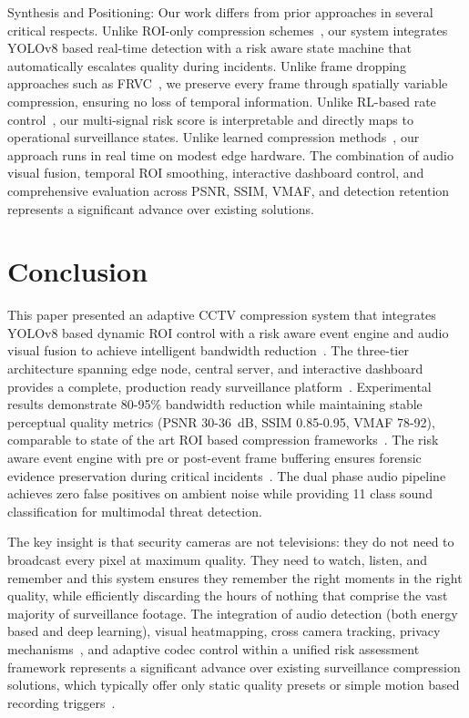 \documentclass[11pt,a4paper]{article}
\begin{document}
Synthesis and Positioning: Our work differs from prior approaches in several critical respects. Unlike ROI-only compression schemes~\cite{wang2025compression,li2024region,labiod2023region}, our system integrates YOLOv8 based real-time detection with a risk aware state machine that automatically escalates quality during incidents. Unlike frame dropping approaches such as FRVC~\cite{agrawal2025frvc}, we preserve every frame through spatially variable compression, ensuring no loss of temporal information. Unlike RL-based rate control~\cite{gadot2025rlrc}, our multi-signal risk score is interpretable and directly maps to operational surveillance states. Unlike learned compression methods~\cite{lu2024transformer}, our approach runs in real time on modest edge hardware. The combination of audio visual fusion, temporal ROI smoothing, interactive dashboard control, and comprehensive evaluation across PSNR, SSIM, VMAF, and detection retention represents a significant advance over existing solutions.

\section{Conclusion}
This paper presented an adaptive CCTV compression system that integrates YOLOv8 based dynamic ROI control with a risk aware event engine and audio visual fusion to achieve intelligent bandwidth reduction~\cite{jocher2023yolov8,gadot2025rlrc}. The three-tier architecture spanning edge node, central server, and interactive dashboard provides a complete, production ready surveillance platform~\cite{liu2025edge}. Experimental results demonstrate 80-95\% bandwidth reduction while maintaining stable perceptual quality metrics (PSNR 30-36~dB, SSIM 0.85-0.95, VMAF 78-92), comparable to state of the art ROI based compression frameworks~\cite{wang2025compression,agrawal2025frvc}. The risk aware event engine with pre or post-event frame buffering ensures forensic evidence preservation during critical incidents~\cite{chuang2025adaptive}. The dual phase audio pipeline achieves zero false positives on ambient noise while providing 11 class sound classification for multimodal threat detection.

The key insight is that security cameras are not televisions: they do not need to broadcast every pixel at maximum quality. They need to watch, listen, and remember and this system ensures they remember the right moments in the right quality, while efficiently discarding the hours of nothing that comprise the vast majority of surveillance footage. The integration of audio detection (both energy based and deep learning), visual heatmapping, cross camera tracking, privacy mechanisms~\cite{kim2024privacy}, and adaptive codec control within a unified risk assessment framework represents a significant advance over existing surveillance compression solutions, which typically offer only static quality presets or simple motion based recording triggers~\cite{guo2023deepstream,ahmad2024bandwidth}.
\end{document}
